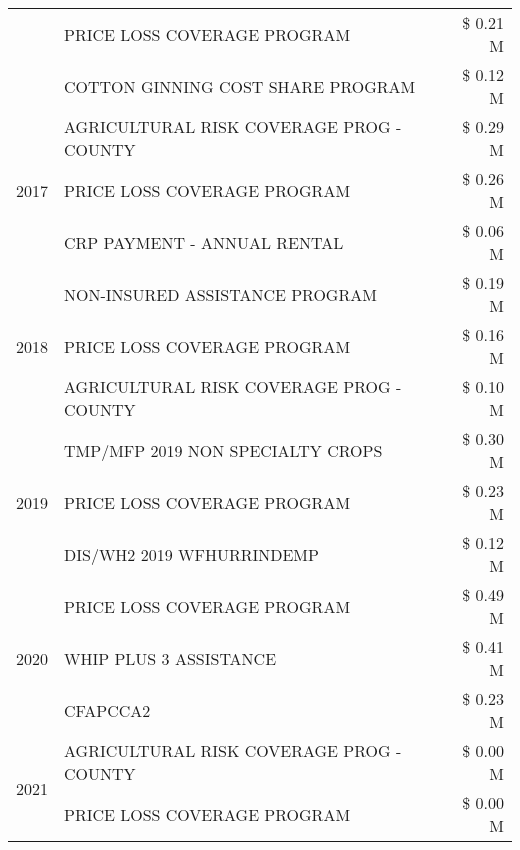 \begin{tabular}{llr}
 & PRICE LOSS COVERAGE PROGRAM                   & \$ 0.21 M \\
 & COTTON GINNING COST SHARE PROGRAM             & \$ 0.12 M \\
\cline{1-3}
\multirow[t]{3}{*}{2017} & AGRICULTURAL RISK COVERAGE PROG - COUNTY & \$ 0.29 M \\
 & PRICE LOSS COVERAGE PROGRAM & \$ 0.26 M \\
 & CRP PAYMENT - ANNUAL RENTAL & \$ 0.06 M \\
\cline{1-3}
\multirow[t]{3}{*}{2018} & NON-INSURED ASSISTANCE PROGRAM & \$ 0.19 M \\
 & PRICE LOSS COVERAGE PROGRAM & \$ 0.16 M \\
 & AGRICULTURAL RISK COVERAGE PROG - COUNTY & \$ 0.10 M \\
\cline{1-3}
\multirow[t]{3}{*}{2019} & TMP/MFP 2019 NON SPECIALTY CROPS & \$ 0.30 M \\
 & PRICE LOSS COVERAGE PROGRAM & \$ 0.23 M \\
 & DIS/WH2 2019 WFHURRINDEMP & \$ 0.12 M \\
\cline{1-3}
\multirow[t]{3}{*}{2020} & PRICE LOSS COVERAGE PROGRAM & \$ 0.49 M \\
 & WHIP PLUS 3 ASSISTANCE & \$ 0.41 M \\
 & CFAPCCA2 & \$ 0.23 M \\
\cline{1-3}
\multirow[t]{2}{*}{2021} & AGRICULTURAL RISK COVERAGE PROG - COUNTY & \$ 0.00 M \\
 & PRICE LOSS COVERAGE PROGRAM & \$ 0.00 M \\
\cline{1-3}
\bottomrule
\end{tabular}
